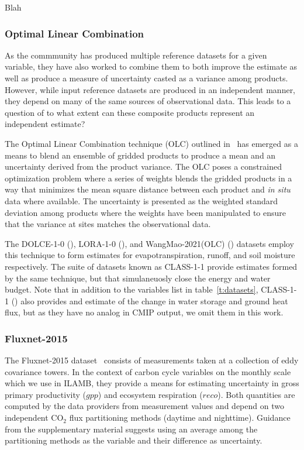 \documentclass{agujournal}
\begin{document}
Blah

\subsubsection{Optimal Linear Combination}\label{s:olc}

As the commmunity has produced multiple reference datasets for a given variable, they have also worked to combine them to both improve the estimate as well as produce a measure of uncertainty casted as a variance among products. However, while input reference datasets are produced in an independent manner, they depend on many of the same sources of observational data. This leads to a question of to what extent can these composite products represent an independent estimate?

The Optimal Linear Combination technique (OLC) outlined in~\cite{Bishop_ClimDyn_20130801} has emerged as a means to blend an ensemble of gridded products to produce a mean and an uncertainty derived from the product variance. The OLC poses a constrained optimization problem where a series of weights blends the gridded products in a way that minimizes the mean square distance between each product and {\it in situ} data where available. The uncertainty is presented as the weighted standard deviation among products where the weights have been manipulated to ensure that the variance at sites matches the observational data.

The DOLCE-1-0 (\cite{Hobeichi_HESS_20180218,Hobeichi_DOLCE_20210419}), LORA-1-0 (\cite{Hobeichi_HESS_20190219,Hobeichi_LORA_20191115}), and WangMao-2021(OLC) (\cite{Wang_ESSD_20210907,Wang_WangMao-2021_20210101}) datasets employ this technique to form estimates for evapotranspiration, runoff, and soil moisture respectively. The suite of datasets known as CLASS-1-1 provide estimates formed by the same technique, but that simulaneuosly close the energy and water budget. Note that in addition to the variables list in table~\ref{t:datasets}, CLASS-1-1 (\cite{Hobeichi_JClim_20200301,Hobeichi_CLASS_20191115}) also provides and estimate of the change in water storage and ground heat flux, but as they have no analog in CMIP output, we omit them in this work.

\subsubsection{Fluxnet-2015}\label{s:fluxnet}

The Fluxnet-2015 dataset~\cite{Pastorello_SciData_20200709} consists of measurements taken at a collection of eddy covariance towers. In the context of carbon cycle variables on the monthly scale which we use in ILAMB, they provide a means for estimating uncertainty in gross primary productivity ($\mathit{gpp}$) and ecosystem respiration ($\mathit{reco}$). Both quantities are computed by the data providers from measurement values and depend on two independent CO$_2$ flux partitioning methods (daytime and nighttime). Guidance from the supplementary material suggests using an average among the partitioning methods as the variable and their difference as uncertainty.
\end{document}
